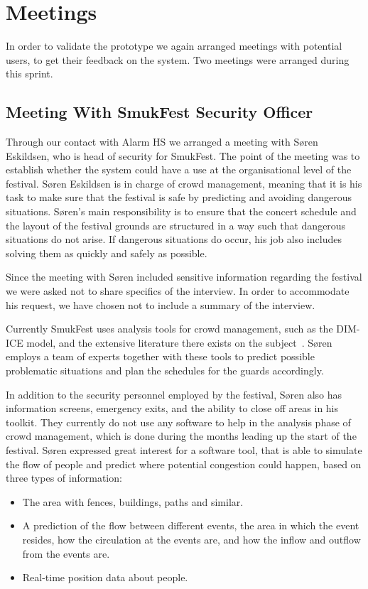 \section{Meetings}

In order to validate the prototype we again arranged meetings with potential users, to get their feedback on the system. Two meetings were arranged during this sprint.

\subsection{Meeting With SmukFest Security Officer}

Through our contact with Alarm HS we arranged a meeting with Søren Eskildsen, who is head of security for SmukFest. The point of the meeting was to establish whether the system could have a use at the organisational level of the festival. Søren Eskildsen is in charge of crowd management, meaning that it is his task to make sure that the festival is safe by predicting and avoiding dangerous situations. Søren's main responsibility is to ensure that the concert schedule and the layout of the festival grounds are structured in a way such that dangerous situations do not arise. If dangerous situations do occur, his job also includes solving them as quickly and safely as possible.

Since the meeting with Søren included sensitive information regarding the festival we were asked not to share specifics of the interview. In order to accommodate his request, we have chosen not to include a summary of the interview.

Currently SmukFest uses analysis tools for crowd management, such as the DIM-ICE model, and the extensive literature there exists on the subject~\cite{dimice}. Søren employs a team of experts together with these tools to predict possible problematic situations and plan the schedules for the guards accordingly.

In addition to the security personnel employed by the festival, Søren also has information screens, emergency exits, and the ability to close off areas in his toolkit. They currently do not use any software to help in the analysis phase of crowd management, which is done during the months leading up the start of the festival. Søren expressed great interest for a software tool, that is able to simulate the flow of people and predict where potential congestion could happen, based on three types of information:

\begin{itemize}
    \item The area with fences, buildings, paths and similar.
    \item A prediction of the flow between different events, the area in which the event resides, how the circulation at the events are, and how the inflow and outflow from the events are.
    \item Real-time position data about people.

\end{itemize}

